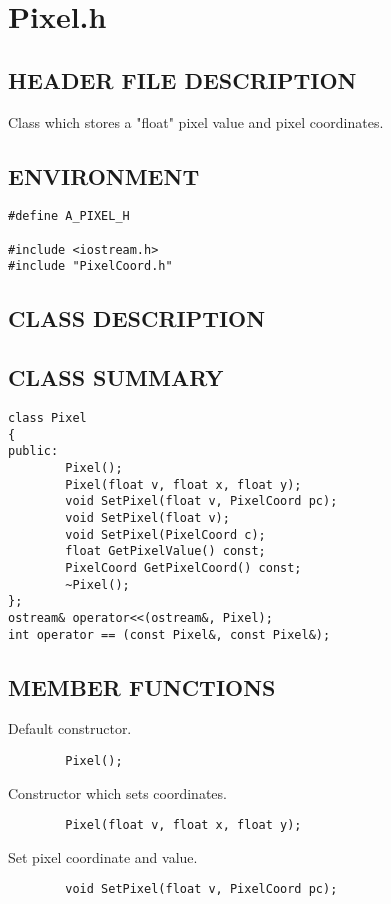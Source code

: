 \clearpage
\section{Pixel.h}

\subsection*{HEADER FILE DESCRIPTION}
Class which stores a "float" pixel value and pixel coordinates.
  
\subsection*{ENVIRONMENT}
\begin{verbatim}
#define A_PIXEL_H

#include <iostream.h>
#include "PixelCoord.h"
\end{verbatim}

\subsection*{CLASS DESCRIPTION}

\subsection*{CLASS SUMMARY}
\begin{verbatim}
class Pixel
{
public:
        Pixel();
        Pixel(float v, float x, float y);
        void SetPixel(float v, PixelCoord pc);
        void SetPixel(float v);
        void SetPixel(PixelCoord c);
        float GetPixelValue() const;
        PixelCoord GetPixelCoord() const;
        ~Pixel();
};
ostream& operator<<(ostream&, Pixel);
int operator == (const Pixel&, const Pixel&);
\end{verbatim}

\subsection*{MEMBER FUNCTIONS}
         Default constructor.
\begin{verbatim}
        Pixel();
\end{verbatim}

         Constructor which sets coordinates.
\begin{verbatim}
        Pixel(float v, float x, float y);
\end{verbatim}

         Set pixel coordinate and value.
\begin{verbatim}
        void SetPixel(float v, PixelCoord pc);
\end{verbatim}

